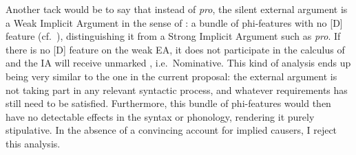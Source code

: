 \begin{exe}
\begin{xlist}
\begin{xlist}
\begin{exe}
\begin{exe}
\begin{xlist}
\begin{exe}
\begin{xlist}
\begin{exe}
\begin{xlist}
\begin{xlist}
\begin{exe}
\begin{xlist}
\begin{exe}
\begin{xlist}
\begin{exe}
\begin{exe}
\begin{exe}
\begin{xlist}
\begin{exe}
\begin{exe}
\begin{xlist}
\begin{xlist}
\begin{exe}
\begin{xlist}
\begin{exe}
\begin{exe}
\begin{exe}
\begin{xlist}
\begin{exe}
\begin{exe}
\begin{xlist}
\begin{exe}
\begin{xlist}
\begin{exe}
\begin{xlist}
\begin{exe}
\begin{xlist}
\begin{exe}
\begin{exe}
\begin{xlist}
\begin{exe}
\begin{exe}
\begin{xlist}
\begin{xlist}
\begin{exe}
\begin{xlist}
\begin{xlist}
\begin{exe}
\begin{xlist}
\begin{exe}
\begin{xlist}
\begin{exe}
\begin{xlist}
\begin{exe}
\begin{xlist}
\begin{exe}
\begin{exe}
\begin{exe}
\begin{exe}
\begin{xlist}
\begin{exe}
\begin{exe}
\begin{xlist}
\begin{xlist}
\begin{exe}
\begin{exe}
\begin{xlist}
\begin{exe}
\begin{xlist}
\begin{exe}
\begin{xlist}
	
 \z
\z 

Another tack would be to say that instead of \emph{pro}, the silent external argument is a Weak Implicit Argument in the sense of \cite{landau10}: a bundle of phi-features with no [D] feature (cf.~\citealt{legate14,bhattpancheva17}), distinguishing it from a Strong Implicit Argument such as \emph{pro}. If there is no [D] feature on the weak EA, it does not participate in the calculus of  and the IA will receive unmarked , i.e.~Nominative. This kind of analysis ends up being very similar to the one in the current proposal: the external argument is not taking part in any relevant syntactic process, and whatever requirements {\vd} has still need to be satisfied. Furthermore, this bundle of phi-features would then have no detectable effects in the syntax or phonology, rendering it purely stipulative. In the absence of a convincing account for implied causers, I reject this analysis.


\end{xlist}
\end{exe}
\end{xlist}
\end{exe}
\end{xlist}
\end{exe}
\end{exe}
\end{xlist}
\end{xlist}
\end{exe}
\end{exe}
\end{xlist}
\end{exe}
\end{exe}
\end{exe}
\end{exe}
\end{xlist}
\end{exe}
\end{xlist}
\end{exe}
\end{xlist}
\end{exe}
\end{xlist}
\end{exe}
\end{xlist}
\end{xlist}
\end{exe}
\end{xlist}
\end{xlist}
\end{exe}
\end{exe}
\end{xlist}
\end{exe}
\end{exe}
\end{xlist}
\end{exe}
\end{xlist}
\end{exe}
\end{xlist}
\end{exe}
\end{xlist}
\end{exe}
\end{exe}
\end{xlist}
\end{exe}
\end{exe}
\end{exe}
\end{xlist}
\end{exe}
\end{xlist}
\end{xlist}
\end{exe}
\end{exe}
\end{xlist}
\end{exe}
\end{exe}
\end{exe}
\end{xlist}
\end{exe}
\end{xlist}
\end{exe}
\end{xlist}
\end{xlist}
\end{exe}
\end{xlist}
\end{exe}
\end{xlist}
\end{exe}
\end{exe}
\end{xlist}
\end{xlist}
\end{exe}
